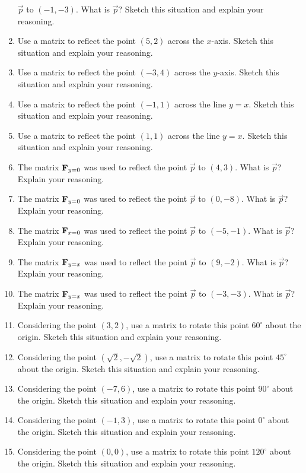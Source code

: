 \begin{problems}
\begin{enumerate}
  $\vec{p}$ to $(-1,-3)$.  What is $\vec{p}$? Sketch this situation
  and explain your reasoning.
\item Use a matrix to reflect the point $(5,2)$ across the
  $x$-axis. Sketch this situation and explain your reasoning.
\item Use a matrix to reflect the point $(-3,4)$ across the
  $y$-axis. Sketch this situation and explain your reasoning.
\item Use a matrix to reflect the point $(-1,1)$ across the line
  $y=x$. Sketch this situation
  and explain your reasoning.
\item Use a matrix to reflect the point $(1,1)$ across the line
  $y=x$. Sketch this situation
  and explain your reasoning.
\item The matrix $\mathbf{F}_{y=0}$ was used to reflect the point $\vec{p}$
  to $(4,3)$.  What is $\vec{p}$? Explain your reasoning.
\item The matrix $\mathbf{F}_{y=0}$ was used to reflect the point $\vec{p}$
  to $(0,-8)$.  What is $\vec{p}$? Explain your reasoning.
\item The matrix $\mathbf{F}_{x=0}$ was used to reflect the point $\vec{p}$
  to $(-5,-1)$.  What is $\vec{p}$? Explain your reasoning.
\item The matrix $\mathbf{F}_{y=x}$ was used to reflect the point $\vec{p}$
  to $(9,-2)$.  What is $\vec{p}$? Explain your reasoning.
\item The matrix $\mathbf{F}_{y=x}$ was used to reflect the point $\vec{p}$
  to $(-3,-3)$.  What is $\vec{p}$? Explain your reasoning.
\item Considering the point $(3,2)$, use a matrix to rotate this point
  $60^\circ$ about the origin.  Sketch this situation and explain your
  reasoning.  
\item Considering the point $(\sqrt{2},-\sqrt{2})$, use a matrix to
  rotate this point $45^\circ$ about the origin.  Sketch this
  situation and explain your reasoning.
\item Considering the point $(-7,6)$, use a matrix to rotate this point
  $90^\circ$ about the origin.  Sketch this situation and explain your
  reasoning.  
\item Considering the point $(-1,3)$, use a matrix to rotate this point
  $0^\circ$ about the origin.  Sketch this situation and explain your
  reasoning.  
\item Considering the point $(0,0)$, use a matrix to rotate this point
  $120^\circ$ about the origin.  Sketch this situation and explain your
  reasoning.  

\end{enumerate}
\end{problems}
